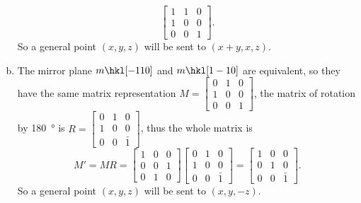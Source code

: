 \documentclass[openany]{homework}
\begin{document}
\begin{enumerate}[a.]
\begin{equation}
\begin{bmatrix}
                                1 & 1 & 0\\
                                1 & 0 & 0\\
                                0 & 0 & 1
                        \end{bmatrix}.
    \end{equation}
    So a general point $(x, y, z)$ will be sent to $(x+y, x, z)$.
    \item The mirror plane $m \hkl[-1 1 0]$ and $m \hkl[1 -1 0]$ are equivalent, so they have the same matrix representation
    $M = \left[\begin{smallmatrix}
                        0 & 1 & 0\\
                        1 & 0 & 0\\
                        0 & 0 & 1
    \end{smallmatrix}
    \right]$, the matrix of rotation by \SI{180}{\degree} is 
    $R = \left[\begin{smallmatrix}
                    0 & 1 & 0\\
                    1 & 0 & 0\\
                    0 & 0 & \bar{1}
    \end{smallmatrix}
    \right]$, thus the whole matrix is
    \begin{equation}
            M' = M R = \begin{bmatrix}
                                    1 & 0 & 0\\
                                    0 & 0 & 1\\
                                    0 & 1 & 0
                            \end{bmatrix}
                            \begin{bmatrix}
                                   0 & 1 & 0\\
                                   1 & 0 & 0\\
                                   0 & 0 & \bar{1}
                            \end{bmatrix} = 
                            \begin{bmatrix}
                                    1 & 0 & 0\\
                                    0 & 1 & 0\\
                                    0 & 0 & \bar{1}
                            \end{bmatrix}.
    \end{equation}
    So a general point $(x, y, z)$ will be sent to $(x, y, -z)$.
\end{enumerate}
\end{document}
